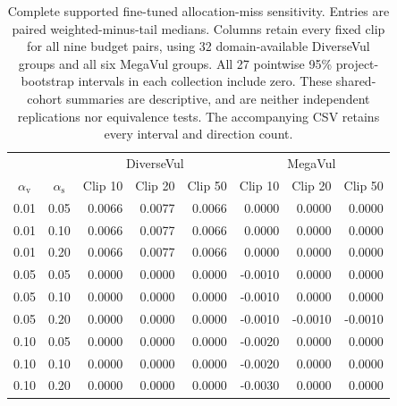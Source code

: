 \begin{table}[H]\centering\small
\caption{Complete supported fine-tuned allocation-miss sensitivity. Entries are paired weighted-minus-tail medians. Columns retain every fixed clip for all nine budget pairs, using 32 domain-available DiverseVul groups and all six MegaVul groups. All 27 pointwise 95\% project-bootstrap intervals in each collection include zero. These shared-cohort summaries are descriptive, and are neither independent replications nor equivalence tests. The accompanying CSV retains every interval and direction count.}
\label{si:allocsensitivity}
\begin{tabular}{@{}ccrrrrrr@{}}\toprule & & \multicolumn{3}{c}{DiverseVul} & \multicolumn{3}{c}{MegaVul}\\
$\alpha_{\mathrm v}$ & $\alpha_{\mathrm s}$ & Clip 10 & Clip 20 & Clip 50 & Clip 10 & Clip 20 & Clip 50\\\midrule
0.01 & 0.05 & 0.0066 & 0.0077 & 0.0066 & 0.0000 & 0.0000 & 0.0000\\
0.01 & 0.10 & 0.0066 & 0.0077 & 0.0066 & 0.0000 & 0.0000 & 0.0000\\
0.01 & 0.20 & 0.0066 & 0.0077 & 0.0066 & 0.0000 & 0.0000 & 0.0000\\
0.05 & 0.05 & 0.0000 & 0.0000 & 0.0000 & -0.0010 & 0.0000 & 0.0000\\
0.05 & 0.10 & 0.0000 & 0.0000 & 0.0000 & -0.0010 & 0.0000 & 0.0000\\
0.05 & 0.20 & 0.0000 & 0.0000 & 0.0000 & -0.0010 & -0.0010 & -0.0010\\
0.10 & 0.05 & 0.0000 & 0.0000 & 0.0000 & -0.0020 & 0.0000 & 0.0000\\
0.10 & 0.10 & 0.0000 & 0.0000 & 0.0000 & -0.0020 & 0.0000 & 0.0000\\
0.10 & 0.20 & 0.0000 & 0.0000 & 0.0000 & -0.0030 & 0.0000 & 0.0000\\
\bottomrule\end{tabular}\end{table}

